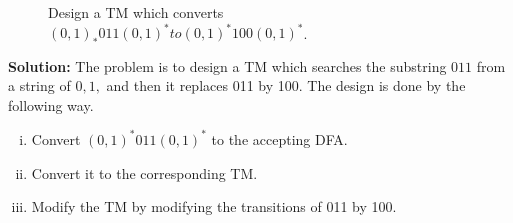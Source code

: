 \documentclass[fontsize=8pt,paper=A4, DIV=9]{scrartcl}
\begin{document}
\begin{figure}[H] %
 Design a TM which converts $(0, 1)_{*}011(0, 1)^{*} to (0, 1)^{*}100(0, 1)^{*}$.

\end{figure}
\textbf{Solution:} The problem is to design a TM which searches the substring $011$ from a string of $0, 1,$ and then
it replaces 011 by 100. The design is done by the following way.
\begin{enumerate}[i)]
\item  Convert $(0, 1)^{*}011(0, 1)^{*}$ to the accepting DFA.
\item  Convert it to the corresponding TM.
\item  Modify the TM by modifying the transitions of 011 by 100. 
\end{enumerate}

\end{document}
